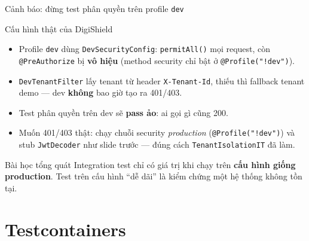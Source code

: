 \documentclass[aspectratio=169,12pt]{beamer}
\begin{document}
\begin{frame}{Cảnh báo: đừng test phân quyền trên profile \texttt{dev}}
  \begin{alertblock}{Cấu hình thật của DigiShield}
    \begin{itemize}\small
      \item Profile \texttt{dev} dùng \texttt{DevSecurityConfig}:
        \texttt{permitAll()} mọi request, còn \texttt{@PreAuthorize} bị
        \textbf{vô hiệu} (method security chỉ bật ở \texttt{@Profile("!dev")}).
      \item \texttt{DevTenantFilter} lấy tenant từ header
        \texttt{X-Tenant-Id}, thiếu thì fallback tenant demo --- dev
        \textbf{không} bao giờ tạo ra 401/403.
    \end{itemize}
  \end{alertblock}
  \begin{itemize}
    \item Test phân quyền trên dev sẽ \textbf{pass ảo}: ai gọi gì cũng 200.
    \item Muốn 401/403 thật: chạy chuỗi security \emph{production}
      (\texttt{@Profile("!dev")}) và stub \texttt{JwtDecoder} như slide trước
      --- đúng cách \texttt{TenantIsolationIT} đã làm.
  \end{itemize}
  \begin{exampleblock}{Bài học tổng quát}
    Integration test chỉ có giá trị khi chạy trên \textbf{cấu hình giống
    production}. Test trên cấu hình ``dễ dãi'' là kiểm chứng một hệ thống
    không tồn tại.
  \end{exampleblock}
\end{frame}

\section{Testcontainers}
\end{document}
